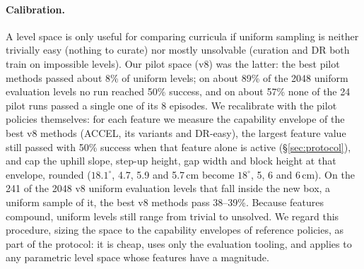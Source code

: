 \paragraph{Calibration.}
A level space is only useful for comparing curricula if uniform sampling is
neither trivially easy (nothing to curate) nor mostly unsolvable (curation
and DR both train on impossible levels). Our pilot space (v8) was the
latter: the best pilot methods passed about 8\% of uniform levels; on
about 89\% of the 2048 uniform evaluation levels no run reached 50\%
success, and on about 57\% none of the 24 pilot runs passed a single one
of its 8 episodes. We recalibrate with the pilot policies themselves: for
each feature we measure the capability envelope of the best v8 methods
(ACCEL, its variants and DR-easy), the largest feature value still passed
with 50\% success when that feature alone is active
(\S\ref{sec:protocol}), and cap the uphill slope, step-up height, gap width
and block height at that envelope, rounded
($18.1^\circ$, 4.7, 5.9 and 5.7\,cm become $18^\circ$, 5, 6 and 6\,cm).
On the 241 of the 2048 v8 uniform evaluation levels that fall inside the
new box, a uniform sample of it, the best v8 methods pass 38--39\%.
Because features compound, uniform levels still range from trivial to
unsolved. We regard this procedure, sizing the space to the capability
envelopes of reference policies, as part of the protocol: it is cheap,
uses only the evaluation tooling, and applies to any parametric level
space whose features have a magnitude.
